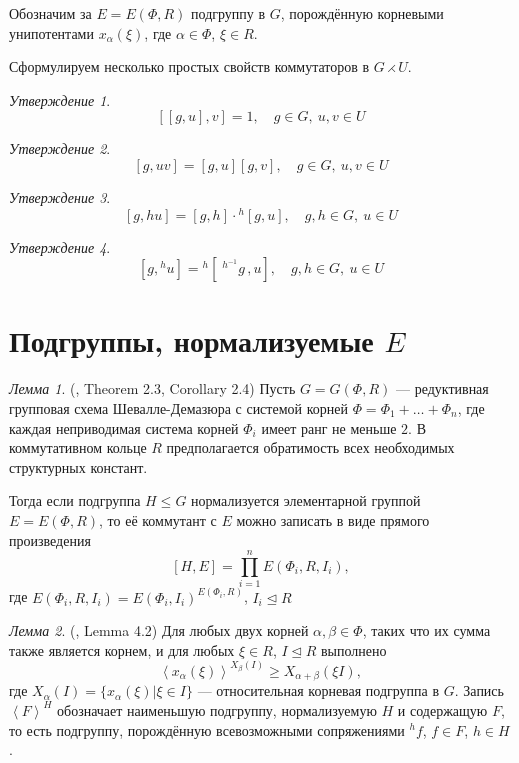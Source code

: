 \documentclass[10pt]{article}
\theoremstyle{remark}
\newtheorem{prop}{Утверждение}
\newtheorem{lm}{Лемма}
\renewcommand{\le}{\leqslant}
\renewcommand{\ge}{\geqslant}
\begin{document}
Обозначим за $E = E(\Phi,R)$ подгруппу в $G$, порождённую корневыми унипотентами $x_\alpha(\xi)$, где $\alpha \in \Phi$, $\xi \in R$.

Сформулируем несколько простых свойств коммутаторов в $G \rightthreetimes U$.

\begin{prop}
  $$[[g,u],v] = 1, \quad g \in G, \ u,v \in U $$
\end{prop}

\begin{prop}
  $$[g,uv] = [g,u][g,v], \quad g \in G, \ u,v \in U $$
\end{prop}

\begin{prop}
  $$[g,hu] = [g,h]\cdot{}^h[g,u], \quad g,h \in G, \ u \in U $$
\end{prop}

\begin{prop}
  $$[g,{}^{h}u] = {}^h[\;{}^{h^{-1}}g\,,u], \quad g,h \in G, \ u \in U $$
\end{prop}


\section{Подгруппы, нормализуемые $E$}

\begin{lm}(\citep{Stavrova2009}, Theorem 2.3, Corollary 2.4)
  \label{directproduct}
  Пусть $G = G(\Phi, R)$ --- редуктивная групповая схема Шевалле-Демазюра
  с системой корней $\Phi = \Phi_1 + \ldots + \Phi_n$, где каждая неприводимая система корней $\Phi_i$ имеет ранг не меньше $2$. В коммутативном кольце $R$ предполагается обратимость всех необходимых структурных констант.
  
  Тогда если подгруппа $H \le G$ нормализуется элементарной группой $E = E(\Phi,R)$, то её коммутант с $E$ можно записать в виде прямого произведения
  $$ [H, E] = \prod_{i=1}^n E(\Phi_i,R,I_i), $$
  где $E(\Phi_i,R,I_i) = E(\Phi_i,I_i)^{E(\Phi_i,R)}$, $I_i \trianglelefteq R$
\end{lm}

\begin{lm}(\citep{Stavrova2009}, Lemma 4.2)
  \label{transitivity}
  Для любых двух корней $\alpha, \beta \in \Phi$, таких что их сумма также является корнем, и для любых  $\xi \in R$, $I \trianglelefteq R$ выполнено
  $$ \left< x_\alpha(\xi) \right>^{X_\beta(I)} \ge X_{\alpha + \beta}(\xi I), $$  
  где $X_\alpha(I) = \{x_\alpha(\xi) | \xi \in I\}$ --- относительная корневая подгруппа в $G$. Запись $\left<F\right>^H$ обозначает наименьшую подгруппу, нормализуемую $H$ и содержащую $F$, то есть подгруппу, порождённую всевозможными сопряжениями $^hf$, $f \in F$, $h \in H$.
\end{lm}
\end{document}
